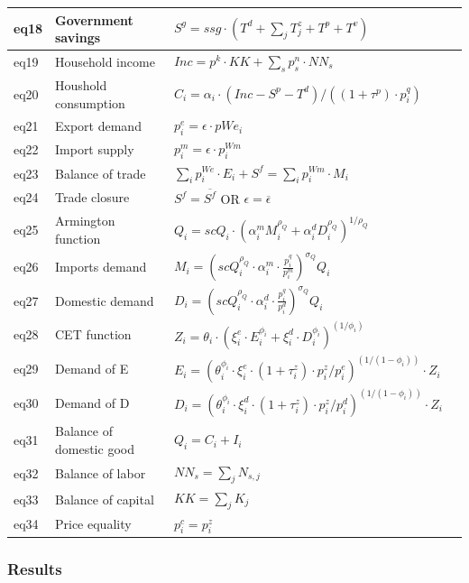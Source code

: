 \begin{table}[!h]
\begin{tabular}{llll}
		eq18 & Government savings & $S^g = ssg \cdot  (T^d + \sum_j T^z_j + T^p + T^v)$ \\
		\midrule
		eq19 & Household income &  $Inc = p^k \cdot KK + \sum_s p^n_s \cdot NN_s $ \\
		eq20 & Houshold consumption & $C_i = \alpha_i \cdot  (Inc -S^p - T^d) / ((1+\tau^p) \cdot p^q_i) $ \\
		\midrule
		eq21 & Export demand & $p^e_i = \epsilon \cdot pWe_i$ \\
		eq22 & Import supply & $p^m_i =\epsilon \cdot p^{Wm}_i$ \\
		eq23 & Balance of trade & $\sum_i p^{We}_i \cdot E_i +S^f = \sum_i p^{Wm}_i \cdot M_i$ \\
		eq24 & Trade closure & $S^f = \overline{S^f}$  \quad OR \quad $\epsilon = \overline{\epsilon}$  \\
		\midrule
		eq25 & Armington function & $Q_i = scQ_i \cdot (\alpha^m_i M_i^{\rho_Q} + \alpha^d_i D_i^{\rho_Q}  )^{1/\rho_Q} $ \\
		eq26 & Imports demand & $M_i = \left( scQ_i^{\rho_Q} \cdot \alpha_i^m \cdot \frac{p_i^q}{p_i^m} \right)^{\sigma_Q} Q_i$ \\
		eq27& Domestic demand & $D_i = \left( scQ_i^{\rho_Q} \cdot \alpha_i^d \cdot \frac{p_i^q}{p_i^d} \right)^{\sigma_Q} Q_i$ \\
		eq28 & CET function & $Z_i  = \theta_i \cdot  (\xi^e_i \cdot E_i^{\phi_i} + \xi^d_i \cdot D_i^{\phi_i} )^{(1/\phi_i)} $  \\
		eq29 & Demand of E & $  E_i = (\theta_i^{\phi_i} \cdot \xi^e_i\cdot (1+\tau^z_i) \cdot p^z_i/p^e_i)^{(1/(1-\phi_i))} \cdot Z_i $ \\
		eq30 & Demand of D & $ D_i = (\theta_i^{\phi_i} \cdot \xi^d_i \cdot (1+\tau^z_i) \cdot p^z_i/p^d_i)^{(1/(1-\phi_i))} \cdot Z_i $ \\
		\midrule
		eq31 &  Balance of domestic good & $Q_i = C_i + I_i$ &  \\
		eq32 & Balance of labor & $NN_s = \sum_j N_{s,j}$ &   \\
		eq33 & Balance of capital & $KK  = \sum_j K_j $ &   \\
		eq34 & Price equality & $p^c_i = p^z_i$ & \\ 
		\bottomrule
	\end{tabular}
\end{table}

\subsubsection{Results}

